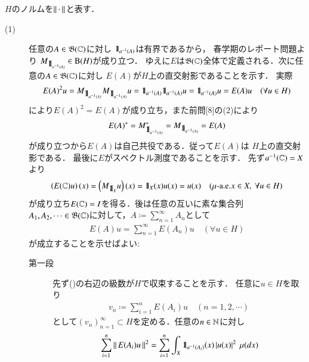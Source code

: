 	\begin{prf} $H$のノルムを$\left\|\, \cdot\, \right\|_{}$と表す．
		\begin{description}
			\item[(1)] 
				任意の$A \in \mathfrak{B}(\mathbb{C})$に対し
				$\mbox{1}\hspace{-0.25em}\mbox{l}_{a^{-1}(A)}$は有界であるから，
				春学期のレポート問題より
				$M_{\mbox{1}\hspace{-0.25em}\mbox{l}_{a^{-1}(A)}} \in \mathrm{B}(H) $が成り立つ．
				ゆえに$E$は$\mathfrak{B}(\mathbb{C})$全体で定義される．次に任意の$A \in \mathfrak{B}(\mathbb{C})$に対し
				$E(A)$が$H$上の直交射影であることを示す．
				実際
				\begin{align}
					E(A)^2 u = M_{\mbox{1}\hspace{-0.25em}\mbox{l}_{a^{-1}(A)}}M_{\mbox{1}\hspace{-0.25em}\mbox{l}_{a^{-1}(A)}}u
					= \mbox{1}\hspace{-0.25em}\mbox{l}_{a^{-1}(A)}\mbox{1}\hspace{-0.25em}\mbox{l}_{a^{-1}(A)}u
					= \mbox{1}\hspace{-0.25em}\mbox{l}_{a^{-1}(A)}u
					= E(A) u
					\quad (\forall u \in H)
				\end{align}
				により$E(A)^2 = E(A)$が成り立ち，また前問[8]の(2)により
				\begin{align}
					E(A)^* = M_{\mbox{1}\hspace{-0.25em}\mbox{l}_{a^{-1}(A)}}^* = M_{\mbox{1}\hspace{-0.25em}\mbox{l}_{a^{-1}(A)}} = E(A)
				\end{align}
				が成り立つから$E(A)$は自己共役である．従って$E(A)$は
				$H$上の直交射影である．
				最後に$E$がスペクトル測度であることを示す．
				先ず$a^{-1}(\mathbb{C}) = X$より
				\begin{align}
					\left( E(\mathbb{C})u \right)(x) = \left( M_{\mbox{1}\hspace{-0.25em}\mbox{l}_X}u \right)(x) 
					= \mbox{1}\hspace{-0.25em}\mbox{l}_X(x) u(x) = u(x)
					\quad (\mbox{$\mu$-a.e.}x \in X,\ \forall u \in H)
				\end{align}
				が成り立ち$E(\mathbb{C}) = I$を得る．後は任意の互いに素な集合列
				$A_1,A_2,\cdots \in \mathfrak{B}(\mathbb{C})$に対して，$A \coloneqq \sum_{n=1}^{\infty}A_n$として
				\begin{align}
					E(A) u = \sum_{n=1}^{\infty} E(A_n) u \quad (\forall u \in H)
					\label{eq:report_9_1}
				\end{align}
				が成立することを示せばよい:
				\begin{description}
					\item[第一段]
						先ず()の右辺の級数が$H$で収束することを示す．
						任意に$u \in H$を取り
						\begin{align}
							v_n \coloneqq \sum_{i=1}^{n} E(A_i) u
							\quad (n=1,2,\cdots)
						\end{align}
						として$(v_n)_{n=1}^{\infty} \subset H$を定める．任意の$n \in \mathbb{N}$に対し
						\begin{align}
							&\sum_{i=1}^{n} \Norm{E(A_i) u}{}^2
							= \sum_{i=1}^{n} \int_X \defunc_{a^{-1}(A_i)}(x) \left| u(x) \right|^2\ \mu(dx) \\

\end{align}
\end{description}
\end{description}
\end{prf}
